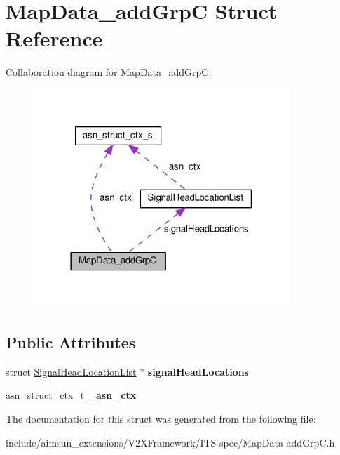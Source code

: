 \hypertarget{structMapData__addGrpC}{}\section{Map\+Data\+\_\+add\+GrpC Struct Reference}
\label{structMapData__addGrpC}


Collaboration diagram for Map\+Data\+\_\+add\+GrpC\+:\nopagebreak
\begin{figure}[H]
\begin{center}
\leavevmode
\includegraphics[width=273pt]{structMapData__addGrpC__coll__graph}
\end{center}
\end{figure}
\subsection*{Public Attributes}
\begin{DoxyCompactItemize}
\item 
struct \hyperlink{structSignalHeadLocationList}{Signal\+Head\+Location\+List} $\ast$ {\bfseries signal\+Head\+Locations}\hypertarget{structMapData__addGrpC_ae921c8d0be1dd631fa0509df1c8f48bc}{}\label{structMapData__addGrpC_ae921c8d0be1dd631fa0509df1c8f48bc}

\item 
\hyperlink{structasn__struct__ctx__s}{asn\+\_\+struct\+\_\+ctx\+\_\+t} {\bfseries \+\_\+asn\+\_\+ctx}\hypertarget{structMapData__addGrpC_a83caebb85a0e18b72877391ccf02f687}{}\label{structMapData__addGrpC_a83caebb85a0e18b72877391ccf02f687}

\end{DoxyCompactItemize}


The documentation for this struct was generated from the following file\+:\begin{DoxyCompactItemize}
\item 
include/aimsun\+\_\+extensions/\+V2\+X\+Framework/\+I\+T\+S-\/spec/Map\+Data-\/add\+Grp\+C.\+h\end{DoxyCompactItemize}
